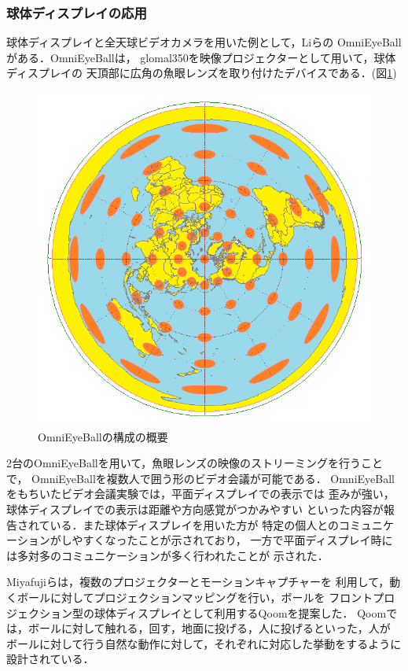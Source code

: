 \subsubsection*{球体ディスプレイの応用}
球体ディスプレイと全天球ビデオカメラを用いた例として，Liらの
OmniEyeBall\cite{18}\cite{24}がある．OmniEyeBallは，
glomal350を映像プロジェクターとして用いて，球体ディスプレイの
天頂部に広角の魚眼レンズを取り付けたデバイスである．(図\ref{proto})
\begin{figure}[tp]
  \centering
  \includegraphics[scale=0.6]{fig/teiso3.png}
  \caption{OmniEyeBallの構成の概要\cite{24}}\label{proto}
\end{figure}

2台のOmniEyeBallを用いて，魚眼レンズの映像のストリーミングを行うことで，
OmniEyeBallを複数人で囲う形のビデオ会議が可能である．
OmniEyeBallをもちいたビデオ会議実験では，平面ディスプレイでの表示では
歪みが強い，球体ディスプレイでの表示は距離や方向感覚がつかみやすい
といった内容が報告されている．また球体ディスプレイを用いた方が
特定の個人とのコミュニケーションがしやすくなったことが示されており，
一方で平面ディスプレイ時には多対多のコミュニケーションが多く行われたことが
示された．

Miyafujiら\cite{25}は，複数のプロジェクターとモーションキャプチャーを
利用して，動くボールに対してプロジェクションマッピングを行い，ボールを
フロントプロジェクション型の球体ディスプレイとして利用するQoomを提案した．
Qoomでは，ボールに対して触れる，回す，地面に投げる，人に投げるといった，人が
ボールに対して行う自然な動作に対して，それぞれに対応した挙動をするように設計されている．

